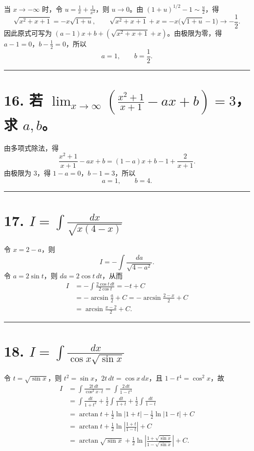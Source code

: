 \documentclass[11pt,a4paper,fontset=windows]{ctexart}
\begin{document}
当 \(x\to-\infty\) 时，令 \(u=\frac1x+\frac1{x^2}\)，则 \(u\to0\)。由 \((1+u)^{1/2}-1\sim\frac u2\)，得
\[
\sqrt{x^2+x+1}=-x\sqrt{1+u},\qquad
\sqrt{x^2+x+1}+x=-x\bigl(\sqrt{1+u}-1\bigr)\longrightarrow-\frac12.
\]
因此原式可写为 \((a-1)x+b+\left(\sqrt{x^2+x+1}+x\right)\)。由极限为零，得 \(a-1=0\)，\(b-\frac12=0\)，所以
\[
\boxed{a=1,\qquad b=\frac12}.
\]

\par{}\vspace{0.5em}\hrule\vspace{0.2em}
\section*{16. 若 \(\displaystyle\lim_{x\to\infty}\left(\frac{x^2+1}{x+1}-ax+b\right)=3\)，求 \(a,b\)。}

由多项式除法，得
\[
\frac{x^2+1}{x+1}-ax+b=(1-a)x+b-1+\frac2{x+1}.
\]
由极限为 \(3\)，得 \(1-a=0\)，\(b-1=3\)，所以
\[
\boxed{a=1,\qquad b=4}.
\]

\par{}\vspace{0.5em}\hrule\vspace{0.2em}
\section*{17. \(\displaystyle I=\int\frac{dx}{\sqrt{x(4-x)}}\)}

令 \(x=2-a\)，则
\[
I=-\int\frac{da}{\sqrt{4-a^2}}.
\]
令 \(a=2\sin t\)，则 \(da=2\cos t\,dt\)，从而
\[
\begin{aligned}
I&=-\int\frac{2\cos t\,dt}{2\cos t}=-t+C\\
&=-\arcsin\frac a2+C
=-\arcsin\frac{2-x}{2}+C\\
&=\boxed{\arcsin\frac{x-2}{2}+C}.
\end{aligned}
\]

\par{}\vspace{0.5em}\hrule\vspace{0.2em}
\section*{18. \(\displaystyle I=\int\frac{dx}{\cos x\sqrt{\sin x}}\)}

令 \(t=\sqrt{\sin x}\)，则 \(t^2=\sin x\)，\(2t\,dt=\cos x\,dx\)，且 \(1-t^4=\cos^2x\)，故
\[
\begin{aligned}
I&=\int\frac{2t\,dt}{\cos^2x\cdot t}
=\int\frac{2\,dt}{1-t^4}\\
&=\int\frac{dt}{1+t^2}
+\frac12\int\frac{dt}{1+t}
+\frac12\int\frac{dt}{1-t}\\
&=\arctan t+\frac12\ln|1+t|-\frac12\ln|1-t|+C\\
&=\arctan t+\frac12\ln\left|\frac{1+t}{1-t}\right|+C\\
&=\boxed{\arctan\sqrt{\sin x}
+\frac12\ln\left|\frac{1+\sqrt{\sin x}}{1-\sqrt{\sin x}}\right|+C}.
\end{aligned}
\]
\end{document}
